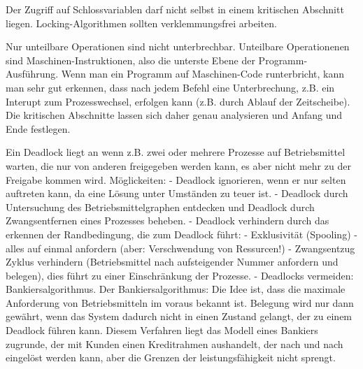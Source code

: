\begin{answer}
Der Zugriff auf Schlossvariablen darf nicht selbst in einem kritischen Abschnitt liegen. Locking-Algorithmen sollten verklemmungsfrei arbeiten.
\end{answer}

\begin{answer}
Nur unteilbare Operationen sind nicht unterbrechbar. Unteilbare Operationenen sind Maschinen-Instruktionen, also die unterste Ebene der Programm-
Ausführung. Wenn man ein Programm auf Maschinen-Code runterbricht, kann man sehr gut erkennen, dass nach jedem Befehl eine Unterbrechung, z.B. ein Interupt zum Prozesswechsel, erfolgen kann (z.B. durch Ablauf der Zeitscheibe). Die kritischen Abschnitte lassen sich daher genau analysieren und Anfang und Ende festlegen.
\end{answer}

\begin{answer}
Ein Deadlock liegt an wenn z.B. zwei oder mehrere Prozesse auf Betriebsmittel warten, die nur
von anderen freigegeben werden kann, es aber nicht mehr zu der Freigabe kommen wird.
Möglickeiten:
- Deadlock ignorieren, wenn er nur selten auftreten kann, da eine Lösung unter Umständen zu
teuer ist.
- Deadlock durch Untersuchung des Betriebsmittelgraphen entdecken und Deadlock durch Zwangsentfernen
eines Prozesses beheben.
- Deadlock verhindern durch das erkennen der Randbedingung, die zum Deadlock führt:
- Exklusivität (Spooling)
- alles auf einmal anfordern (aber: Verschwendung von Ressurcen!)
- Zwangsentzug
Zyklus verhindern (Betriebsmittel nach aufsteigender Nummer anfordern und belegen), dies führt
zu einer Einschränkung der Prozesse.
- Deadlocks vermeiden: Bankiersalgorithmus.
Der Bankiersalgorithmus:
Die Idee ist, dass die maximale Anforderung von Betriebsmitteln im voraus bekannt ist. Belegung
wird nur dann gewährt, wenn das System dadurch nicht in einen Zustand gelangt, der zu einem
Deadlock führen kann. Diesem Verfahren liegt das Modell eines Bankiers zugrunde, der mit Kunden
einen Kreditrahmen aushandelt, der nach und nach eingelöst werden kann, aber die Grenzen der
leistungsfähigkeit nicht sprengt.
\end{answer}

